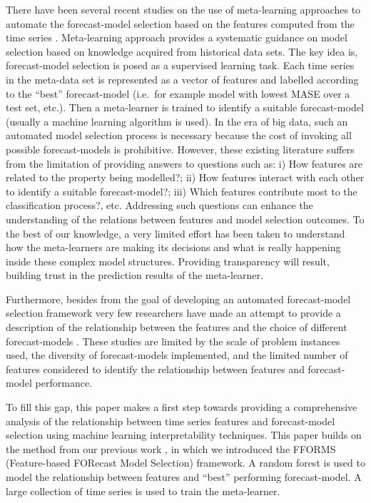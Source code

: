 \documentclass[11pt,a4paper,]{article}
\begin{document}
There have been several recent studies on the use of meta-learning
approaches to automate the forecast-model selection based on the
features computed from the time series
\autocites{shah1997model}{prudencio2004meta}{lemke2010meta}{kuck2016meta}.
Meta-learning approach provides a systematic guidance on model selection
based on knowledge acquired from historical data sets. The key idea is,
forecast-model selection is posed as a supervised learning task. Each
time series in the meta-data set is represented as a vector of features
and labelled according to the ``best'' forecast-model (i.e.~for example
model with lowest MASE over a test set, etc.). Then a meta-learner is
trained to identify a suitable forecast-model (usually a machine
learning algorithm is used). In the era of big data, such an automated
model selection process is necessary because the cost of invoking all
possible forecast-models is prohibitive. However, these existing
literature suffers from the limitation of providing answers to questions
such as: i) How features are related to the property being modelled?;
ii) How features interact with each other to identify a suitable
forecast-model?; iii) Which features contribute most to the
classification process?, etc. Addressing such questions can enhance the
understanding of the relations between features and model selection
outcomes. To the best of our knowledge, a very limited effort has been
taken to understand how the meta-learners are making its decisions and
what is really happening inside these complex model structures.
Providing transparency will result, building trust in the prediction
results of the meta-learner.

Furthermore, besides from the goal of developing an automated
forecast-model selection framework very few researchers have made an
attempt to provide a description of the relationship between the
features and the choice of different forecast-models
\autocites{schnaars1984situational}{wang2009rule}{lemke2010meta}{petropoulos2014horses}.
These studies are limited by the scale of problem instances used, the
diversity of forecast-models implemented, and the limited number of
features considered to identify the relationship between features and
forecast-model performance.

To fill this gap, this paper makes a first step towards providing a
comprehensive analysis of the relationship between time series features
and forecast-model selection using machine learning interpretability
techniques. This paper builds on the method from our previous work
\textcite{fforms}, in which we introduced the FFORMS (Feature-based
FORecast Model Selection) framework. A random forest is used to model
the relationship between features and ``best'' performing
forecast-model. A large collection of time series is used to train the
meta-learner.
\end{document}
